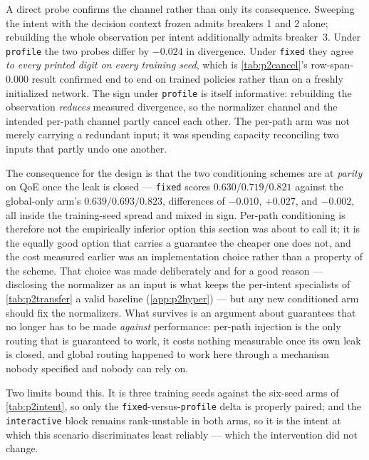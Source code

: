 A direct probe confirms the channel rather than only its consequence. Sweeping the intent with the
decision context frozen admits breakers 1 and 2 alone; rebuilding the whole observation per intent
additionally admits breaker~3. Under \texttt{profile} the two probes differ by $-0.024$ in divergence.
Under \texttt{fixed} they agree \emph{to every printed digit on every training seed}, which is
\cref{tab:p2cancel}'s row-span-0.000 result confirmed end to end on trained policies rather than on a
freshly initialized network. The sign under \texttt{profile} is itself informative: rebuilding the
observation \emph{reduces} measured divergence, so the normalizer channel and the intended per-path
channel partly cancel each other. The per-path arm was not merely carrying a redundant input; it was
spending capacity reconciling two inputs that partly undo one another.

The consequence for the design is that the two conditioning schemes are at \emph{parity} on QoE once the
leak is closed --- \texttt{fixed} scores $0.630 / 0.719 / 0.821$ against the global-only arm's
$0.639 / 0.693 / 0.823$, differences of $-0.010$, $+0.027$, and $-0.002$, all inside the training-seed
spread and mixed in sign. Per-path conditioning is therefore not the empirically inferior option this
section was about to call it; it is the equally good option that carries a guarantee the cheaper one
does not, and the cost measured earlier was an implementation choice rather than a property of the
scheme. That choice was made deliberately and for a good reason --- disclosing the normalizer as an
input is what keeps the per-intent specialists of \cref{tab:p2transfer} a valid baseline
(\cref{app:p2hyper}) --- but any new conditioned arm should fix the normalizers. What survives is an
argument about guarantees that no longer has to be made \emph{against} performance: per-path injection
is the only routing that is guaranteed to work, it costs nothing measurable once its own leak is
closed, and global routing happened to work here through a mechanism nobody specified and nobody can
rely on.

Two limits bound this. It is three training seeds against the six-seed arms of \cref{tab:p2intent}, so
only the \texttt{fixed}-versus-\texttt{profile} delta is properly paired; and the \texttt{interactive}
block remains rank-unstable in both arms, so it is the intent at which this scenario discriminates least
reliably --- which the intervention did not change.

